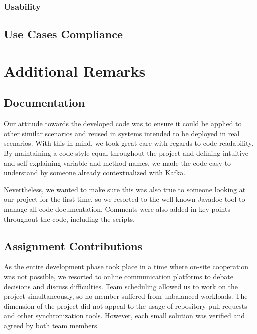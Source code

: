 \documentclass[12pt]{article}
\begin{document}
\subsubsection{Usability} \label{usability}

\subsection{Use Cases Compliance} \label{compliance} %


\newpage
\section{Additional Remarks} \label{remarks} %

\subsection{Documentation} \label{documentation} %

Our attitude towards the developed code was to ensure it could be applied to other similar scenarios and reused in systems intended to be deployed in real scenarios.
With this in mind, we took great care with regards to code readability.
By maintaining a code style equal throughout the project and defining intuitive and self-explaining variable and method names, we made the code easy to understand
by someone already contextualized with Kafka.

Nevertheless, we wanted to make sure this was also true to someone looking at our project for the first time, so we resorted to the well-known Javadoc
\cite{javadoc} tool to manage all code documentation.
Comments were also added in key points throughout the code, including the scripts.

\subsection{Assignment Contributions} \label{contributions} %

As the entire development phase took place in a time where on-site cooperation was not possible, we resorted to online communication platforms to debate decisions
and discuss difficulties.
Team scheduling allowed us to work on the project simultaneously, so no member suffered from unbalanced workloads.
The dimension of the project did not appeal to the usage of repository pull requests and other synchronization tools.
However, each small solution was verified and agreed by both team members.
\end{document}
